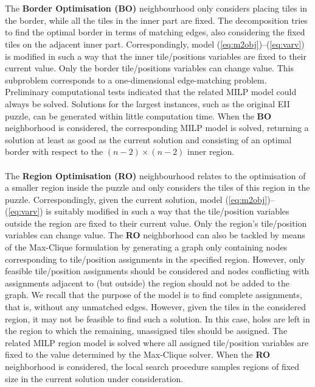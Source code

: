 \documentclass[preprint,12pt]{elsarticle}
\begin{document}
\\
\\
The \textbf{Border Optimisation (BO)} neighbourhood only considers placing tiles in the border, while all the tiles in the inner part are fixed.
The decomposition tries to find the optimal border in terms of matching edges, also considering the fixed tiles on the adjacent inner part. Correspondingly, 
model (\ref{eq:m2obj})--(\ref{eq:varv}) is modified in such a way that 
the inner tile/positions variables are fixed to their current value.  Only the border 
tile/positions variables can change value.
This subproblem corresponds to a one-dimensional edge-matching problem.
Preliminary computational tests indicated that the related MILP model could always be solved.
Solutions for the largest instances, such as the original EII puzzle, can be generated within little computation time. 
When the \textbf{BO} neighborhood is considered, the corresponding MILP model is solved, returning a solution at least as good as the current solution and consisting of an optimal border with respect to the $(n-2)\times (n-2)$ inner region.
\\
\\
The \textbf{Region Optimisation (RO)} neighbourhood relates to the optimisation of a smaller region inside the puzzle and only considers the tiles of this region in the puzzle.
Correspondingly, given the current solution, model (\ref{eq:m2obj})--(\ref{eq:varv}) is suitably modified in such a way that the tile/position variables outside the region are fixed to their current value.
Only the region's tile/position variables can change value.
The \textbf{RO} neighborhood  can also be tackled by means of the Max-Clique formulation by generating a graph only containing nodes corresponding to tile/position assignments in the specified region. However, only feasible tile/position assignments should be considered and nodes conflicting with assignments adjacent to (but outside) the region should not be added to the graph. We recall that the purpose of the model is to find complete assignments, that is, without any unmatched edges. However, given the tiles in the considered region, it may not be feasible to find such a solution.
In this case, holes are left in the region to which the remaining, unassigned tiles should be assigned. The related MILP region model is solved where all assigned tile/position variables are fixed to the value determined by the Max-Clique solver.
When the \textbf{RO} neighborhood is considered, the local search procedure samples regions of fixed size in the current solution under consideration.
\end{document}
